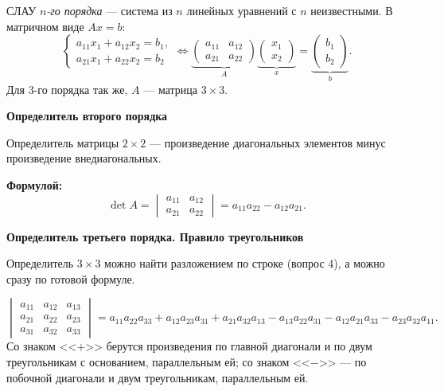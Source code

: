 \documentclass[a4paper,11pt]{article}
\newcommand{\fm}{\par\noindent\textbf{\textcolor{oprc!85!black}{Формулой:}}}
\newcommand{\podr}[1]{\par\needspace{8\baselineskip}\medskip
  {\large\bfseries\textcolor{oprc!80!black}{#1}}\par\nopagebreak\smallskip}
\begin{document}
СЛАУ \emph{$n$-го порядка} --- система из $n$ линейных уравнений с $n$ неизвестными. В матричном виде $Ax = b$:
\[
  \begin{cases} a_{11} x_1 + a_{12} x_2 = b_1, \\ a_{21} x_1 + a_{22} x_2 = b_2 \end{cases}
  \iff
  \underbrace{\begin{pmatrix} a_{11} & a_{12} \\ a_{21} & a_{22} \end{pmatrix}}_{A}
  \underbrace{\begin{pmatrix} x_1 \\ x_2 \end{pmatrix}}_{x} = \underbrace{\begin{pmatrix} b_1 \\ b_2 \end{pmatrix}}_{b}.
\]
Для 3-го порядка так же, $A$ --- матрица $3 \times 3$.

\podr{Определитель второго порядка}

\begin{opr}
Определитель матрицы $2 \times 2$ --- произведение диагональных элементов минус произведение внедиагональных.
\fm
\[
  \det A = \begin{vmatrix} a_{11} & a_{12} \\ a_{21} & a_{22} \end{vmatrix} = a_{11} a_{22} - a_{12} a_{21}.
\]
\end{opr}

\podr{Определитель третьего порядка. Правило треугольников}

Определитель $3 \times 3$ можно найти разложением по строке (вопрос 4), а можно сразу по готовой формуле.

\begin{teo}
\[
  \begin{vmatrix} a_{11} & a_{12} & a_{13} \\ a_{21} & a_{22} & a_{23} \\ a_{31} & a_{32} & a_{33} \end{vmatrix}
  = a_{11}a_{22}a_{33} + a_{12}a_{23}a_{31} + a_{21}a_{32}a_{13} - a_{13}a_{22}a_{31} - a_{12}a_{21}a_{33} - a_{23}a_{32}a_{11}.
\]
Со знаком <<$+$>> берутся произведения по главной диагонали и по двум треугольникам с основанием, параллельным ей;
со знаком <<$-$>> --- по побочной диагонали и двум треугольникам, параллельным ей.
\end{teo}
\end{document}
